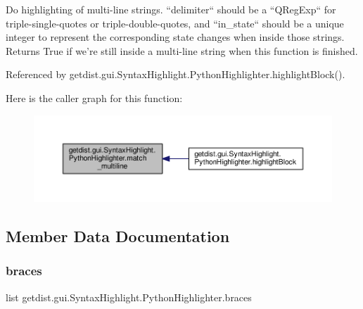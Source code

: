 \begin{DoxyVerb}Do highlighting of multi-line strings. ``delimiter`` should be a
``QRegExp`` for triple-single-quotes or triple-double-quotes, and
``in_state`` should be a unique integer to represent the corresponding
state changes when inside those strings. Returns True if we're still
inside a multi-line string when this function is finished.
\end{DoxyVerb}
 

Referenced by getdist.\+gui.\+Syntax\+Highlight.\+Python\+Highlighter.\+highlight\+Block().

Here is the caller graph for this function\+:
\nopagebreak
\begin{figure}[H]
\begin{center}
\leavevmode
\includegraphics[width=350pt]{classgetdist_1_1gui_1_1SyntaxHighlight_1_1PythonHighlighter_a5407f7f702169da64d32c85cd0c25001_icgraph}
\end{center}
\end{figure}


\subsection{Member Data Documentation}
\mbox{\label{classgetdist_1_1gui_1_1SyntaxHighlight_1_1PythonHighlighter_a3929e5085d8272b031c3ed6052470bde}} 
\subsubsection{\texorpdfstring{braces}{braces}}
{\footnotesize\ttfamily list getdist.\+gui.\+Syntax\+Highlight.\+Python\+Highlighter.\+braces\hspace{0.3cm}{\ttfamily [static]}}


